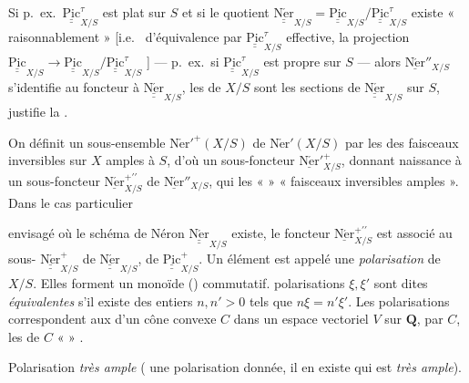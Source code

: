 \documentclass[11pt,a4paper]{article}
\begin{document}
Si p.\ ex.\ $\underline{\underline{\mathrm{Pic}}}^{\tau}_{X/S}$ est plat sur $S$ et si le quotient $\underline{\underline{\mathrm{N\acute{e}r}}}_{X/S} = \underline{\underline{\mathrm{Pic}}}_{X/S}/\underline{\underline{\mathrm{Pic}}}^{\tau}_{X/S}$ existe « raisonnablement » [i.e.\ \struck{\ill{}}   d'équivalence  par $\underline{\underline{\mathrm{Pic}}}^{\tau}_{X/S}$  effective, \ill{} la projection $\underline{\underline{\mathrm{Pic}}}_{X/S} \to \underline{\underline{\mathrm{Pic}}}_{X/S}/\underline{\underline{\mathrm{Pic}}}^{\tau}_{X/S}$ ] — p.\ ex.\ si $\underline{\underline{\mathrm{Pic}}}^{\tau}_{X/S}$ est propre sur $S$ — alors \struck{\ill{}} $\underline{\mathrm{N\acute{e}r}}''_{X/S}$ s'identifie au foncteur  à $\underline{\underline{\mathrm{N\acute{e}r}}}_{X/S}$, les  de $X/S$ sont les sections de $\underline{\underline{\mathrm{N\acute{e}r}}}_{X/S}$ sur $S$, \struck{\ill{}} \ill{} justifie la  \struck{\ill{}} \add{\ill{} \ill{}}.


 On définit un sous-ensemble $\mathrm{N\acute{e}r}'^{+}(X/S)$ de $\mathrm{N\acute{e}r}'(X/S)$ par les  des faisceaux inversibles sur $X$  amples  à $S$, d'où un sous-foncteur $\underline{\mathrm{N\acute{e}r}}'^{+}_{X/S}$, donnant naissance à un sous-foncteur $\underline{\mathrm{N\acute{e}r}}^{+\prime\prime}_{X/S}$ de $\underline{\mathrm{N\acute{e}r}}''_{X/S}$, qui   \ill{} les « \ill{} \ill{} » \ill{} « faisceaux \ill{} inversibles amples ». Dans le cas particulier

envisagé où le schéma de Néron $\underline{\underline{\mathrm{N\acute{e}r}}}_{X/S}$ existe, le foncteur $\underline{\mathrm{N\acute{e}r}}^{+\prime\prime}_{X/S}$ est associé au sous- $\underline{\underline{\mathrm{N\acute{e}r}}}^{+}_{X/S}$ de $\underline{\underline{\mathrm{N\acute{e}r}}}_{X/S}$,  de $\underline{\underline{\mathrm{Pic}}}^{+}_{X/S}$. Un élément \ill{} est appelé une \emph{polarisation} \struck{\ill{}} de $X/S$. Elles forment un monoïde () commutatif.   polarisations $\xi, \xi'$ sont dites \emph{équivalentes} s'il existe des entiers $n, n' > 0$ tels que $n\xi = n'\xi'$. Les  polarisations correspondent aux  d'un cône convexe $C$  dans un espace vectoriel $V$ sur $\mathbf{Q}$,  par $C$,  les  de $C$  «  » \ill{}.

Polarisation \emph{très ample} ( une polarisation donnée, il en existe    qui est \emph{très ample}).

\end{document}
